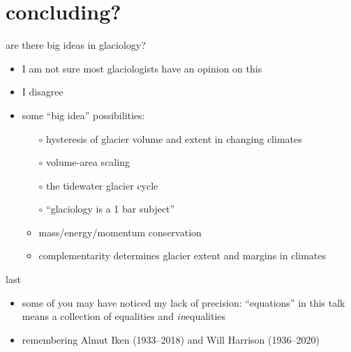 \documentclass[10pt,hyperref,dvipsnames]{beamer}
\begin{document}
\section{concluding?}

\begin{frame}{are there big ideas in glaciology?}
\begin{itemize}
\item I am not sure most glaciologists have an opinion on this
\item I disagree

\bigskip
\item<2-3> some ``big idea'' possibilities:
    \begin{itemize}
    \item[$\circ$] hysteresis of glacier volume and extent in changing climates
    \item[$\circ$] volume-area scaling
    \item[$\circ$] the tidewater glacier cycle
    \item[$\circ$] ``glaciology is a 1 bar subject''
    \item<3>[$\circ$] mass/energy/momentum conservation
    \item<3>[$\circ$] complementarity determines glacier extent and margins in climates
    \end{itemize}
\end{itemize}
\end{frame}

\begin{frame}{last}
\begin{itemize}
\item some of you may have noticed my lack of precision: ``equations'' in this talk means a collection of equalities and \emph{in}equalities
\item remembering Almut Iken (1933--2018) and Will Harrison (1936--2020)
\end{itemize}
\end{frame}
\end{document}
